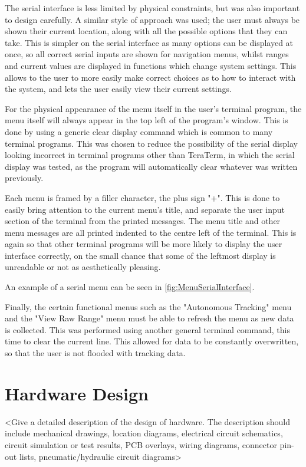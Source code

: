 \documentclass[]{report}
\begin{document}
The serial interface is less limited by physical constraints, but was also important to design carefully. A similar style of approach was used; the user must always be shown their current location, along with all the possible options that they can take. This is simpler on the serial interface as many options can be displayed at once, so all correct serial inputs are shown for navigation menus, whilst ranges and current values are displayed in functions which change system settings. This allows to the user to more easily make correct choices as to how to interact with the system, and lets the user easily view their current settings. 

For the physical appearance of the menu itself in the user's terminal program, the menu itself will always appear in the top left of the program's window. This is done by using a generic clear display command which is common to many terminal programs. This was chosen to reduce the possibility of the serial display looking incorrect in terminal programs other than TeraTerm, in which the serial display was tested, as the program will automatically clear whatever was written previously. 

Each menu is framed by a filler character, the plus sign "+". This is done to easily bring attention to the current menu's title, and separate the user input section of the terminal from the printed messages. The menu title and other menu messages are all printed indented to the centre left of the terminal. This is again so that other terminal programs will be more likely to display the user interface correctly, on the small chance that some of the leftmost display is unreadable or not as aesthetically pleasing.  

An example of a serial menu can be seen in \ref{fig:MenuSerialInterface}.

Finally, the certain functional menus such as the "Autonomous Tracking" menu and the "View Raw Range" menu must be able to refresh the menu as new data is collected. This was performed using another general terminal command, this time to clear the current line. This allowed for data to be constantly overwritten, so that the user is not flooded with tracking data.

\chapter{Hardware Design}
<Give a detailed description of the design of hardware. The description should include mechanical drawings, location diagrams, electrical circuit schematics, circuit simulation or test results, PCB overlays, wiring diagrams, connector pin-out lists, pneumatic/hydraulic circuit diagrams>
\end{document}
